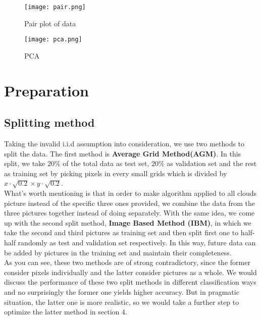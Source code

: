 \documentclass[11pt]{scrartcl} %
\begin{document}
\begin{figure}[htb]
	\centering
	\texttt{[image: pair.png]} %
	\caption{Pair plot of data}
\end{figure}

\begin{figure}[h]
	\centering
	\texttt{[image: pca.png]} %
	\caption{PCA}
\end{figure}



\section{Preparation}
\subsection{Splitting method}
Taking the invalid i.i.d assumption into consideration, we use two methods to split the data. The first method is \textbf{Average Grid Method(AGM)}. In this split,  we take $20\%$ of the total data as test set, $20\%$ as validation set and the rest as training set by picking pixels in every small grids which is divided by $x\cdot \sqrt{0.2} \times y\cdot \sqrt{0.2}$. \\

What's worth mentioning is that in order to make algorithm applied to all clouds picture instead of the specific three ones provided, we combine the data from the three pictures together instead of doing separately. With the same idea, we come up with the second split method, \textbf{Image Based Method (IBM)}, in which we take the second and third pictures as training set and then split first one to half-half randomly as test and validation set respectively. In this way, future data can be added by pictures in the training set and maintain their completeness.\\

As you can see, these two methods are of strong contradictory, since the former consider pixels individually and the latter consider pictures as a whole. We would discuss the performance of these two split methods in different classification ways and no surprisingly the former one yields higher accuracy. But in pragmatic situation, the latter one is more realistic, so we would take a further step to optimize the latter method in section 4. 
\end{document}
